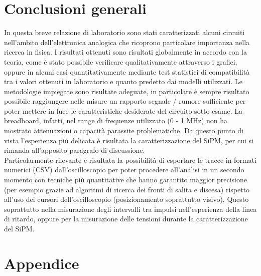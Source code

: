 \documentclass[journal]{IEEEtran}
\begin{document}
\clearpage
\section{Conclusioni generali} %
In questa breve relazione di laboratorio sono stati caratterizzati alcuni circuiti nell'ambito dell'elettronica analogica che ricoprono particolare importanza nella ricerca in fisica. I risultati ottenuti sono risultati globalmente in accordo con la teoria, come è stato possibile verificare qualitativamente attraverso i grafici, oppure in alcuni casi quantitativamente mediante test statistici di compatibilità tra i valori ottenuti in laboratorio e quanto predetto dai modelli utilizzati. Le metodologie impiegate sono risultate adeguate, in particolare è sempre risultato possibile raggiungere nelle misure un rapporto segnale / rumore sufficiente per poter mettere in luce le caratteristiche desiderate del circuito sotto esame. La breadboard, infatti, nel range di frequenze utilizzato (0 - 1 MHz) non ha mostrato attenuazioni o capacità parassite problematiche. Da questo punto di vista l'esperienza più delicata è risultata la caratterizzazione del SiPM, per cui si rimanda all'apposito paragrafo di discussione. \\

Particolarmente rilevante è risultata la possibilità di esportare le tracce in formati numerici (CSV) dall'oscilloscopio per poter procedere all'analisi in un secondo momento con tecniche più quantitative che hanno garantito maggior precisione (per esempio grazie ad algoritmi di ricerca dei fronti di salita e discesa) rispetto all'uso dei cursori dell'oscilloscopio (posizionamento soprattutto visivo). Questo soprattutto nella misurazione degli intervalli tra impulsi nell'esperienza della linea di ritardo, oppure per la misurazione delle tensioni durante la caratterizzazione del SiPM.

\section{Appendice}
\end{document}
